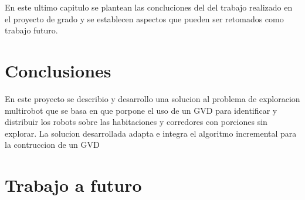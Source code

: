 En este ultimo capitulo se plantean las concluciones del del trabajo realizado
en el proyecto de grado y se establecen aspectos que pueden ser retomados como
trabajo futuro.


\section{Conclusiones}

En este proyecto se describio y desarrollo una solucion al problema de
exploracion multirobot que se basa en \cite{wurm2008coordinated} que porpone el
uso de un GVD para identificar y distribuir los robots sobre las habitaciones y
corredores con porciones sin explorar. La solucion desarrollada adapta e
integra el algoritmo incremental para la contruccion de un GVD





\section{Trabajo a futuro}
